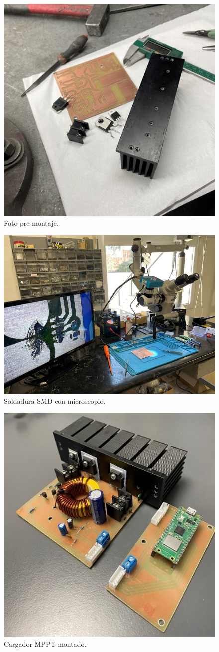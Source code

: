 \begin{figure}[H]
    \centering
    \includegraphics[width=0.75\linewidth]{informes/IMG_8858.jpg}
    \caption{Foto pre-montaje.}
\end{figure}

\begin{figure}[H]
    \centering
    \includegraphics[width=0.75\linewidth]{informes/IMG_8859.jpg}
    \caption{Soldadura SMD con microscopio.}
\end{figure}

\begin{figure}[H]
    \centering
    \includegraphics[width=0.6\linewidth]{informes/IMG_8864.jpg}
    \caption{Cargador MPPT montado.}
\end{figure}

